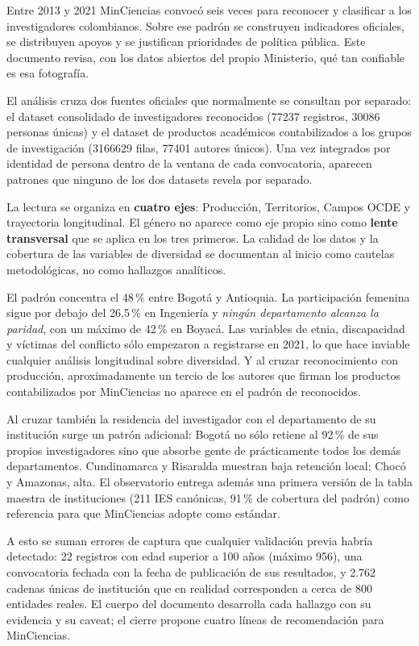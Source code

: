 \documentclass[11pt,a4paper,oneside]{article}
\begin{document}
Entre 2013 y 2021 MinCiencias convocó seis veces para reconocer y clasificar a los investigadores colombianos. Sobre ese padrón se construyen indicadores oficiales, se distribuyen apoyos y se justifican prioridades de política pública. Este documento revisa, con los datos abiertos del propio Ministerio, qué tan confiable es esa fotografía.

El análisis cruza dos fuentes oficiales que normalmente se consultan por separado: el dataset consolidado de investigadores reconocidos (\num{77237} registros, \num{30086} personas únicas) y el dataset de productos académicos contabilizados a los grupos de investigación (\num{3166629} filas, \num{77401} autores únicos). Una vez integrados por identidad de persona dentro de la ventana de cada convocatoria, aparecen patrones que ninguno de los dos datasets revela por separado.

La lectura se organiza en \textbf{cuatro ejes}: Producción, Territorios, Campos OCDE y trayectoria longitudinal. El género no aparece como eje propio sino como \textbf{lente transversal} que se aplica en los tres primeros. La calidad de los datos y la cobertura de las variables de diversidad se documentan al inicio como cautelas metodológicas, no como hallazgos analíticos.

El padrón concentra el 48\,\% entre Bogotá y Antioquia. La participación femenina sigue por debajo del 26{,}5\,\% en Ingeniería y \emph{ningún departamento alcanza la paridad}, con un máximo de 42\,\% en Boyacá. Las variables de etnia, discapacidad y víctimas del conflicto sólo empezaron a registrarse en 2021, lo que hace inviable cualquier análisis longitudinal sobre diversidad. Y al cruzar reconocimiento con producción, aproximadamente un tercio de los autores que firman los productos contabilizados por MinCiencias no aparece en el padrón de reconocidos.

Al cruzar también la residencia del investigador con el departamento de su institución surge un patrón adicional: Bogotá no sólo retiene al 92\,\% de sus propios investigadores sino que absorbe gente de prácticamente todos los demás departamentos. Cundinamarca y Risaralda muestran baja retención local; Chocó y Amazonas, alta. El observatorio entrega además una primera versión de la tabla maestra de instituciones (211 IES canónicas, 91\,\% de cobertura del padrón) como referencia para que MinCiencias adopte como estándar.

A esto se suman errores de captura que cualquier validación previa habría detectado: 22 registros con edad superior a 100 años (máximo 956), una convocatoria fechada con la fecha de publicación de sus resultados, y 2.762 cadenas únicas de institución que en realidad corresponden a cerca de 800 entidades reales. El cuerpo del documento desarrolla cada hallazgo con su evidencia y su caveat; el cierre propone cuatro líneas de recomendación para MinCiencias.
\end{document}

